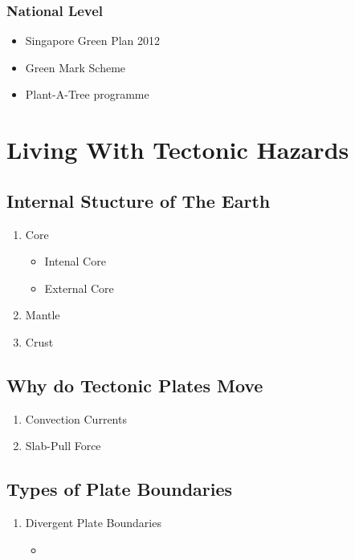 \documentclass[oneside]{book}
\begin{document}
\begin{minipage}{0.5\textwidth}
    \subsection*{National Level}
        \begin{itemize}
            \item Singapore Green Plan 2012
            \item Green Mark Scheme 
            \item Plant-A-Tree programme
        \end{itemize} \vspace{10mm}
    \chapter{Living With Tectonic Hazards}
    \section{Internal Stucture of The Earth}
    \begin{enumerate}
        \item Core
        \begin{itemize}
            \item Intenal Core
            \item External Core
        \end{itemize}
        \item Mantle
        \item Crust
    \end{enumerate}
    \section{Why do Tectonic Plates Move}
    \begin{enumerate}
        \item Convection Currents
        \item Slab-Pull Force
    \end{enumerate}
    \section{Types of Plate Boundaries}
    \begin{enumerate}
        \item Divergent Plate Boundaries
        \begin{itemize}
            \item 
        \end{itemize}
    \end{enumerate}
\end{minipage}
\begin{minipage}{0.5\textwidth}

\end{minipage}

\newpage
\end{document}
